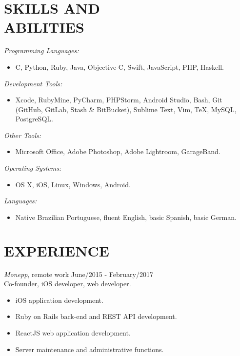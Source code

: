 \documentclass[margin]{res}
\begin{document}
\begin{resume}
		\section{SKILLS AND \\ABILITIES}
			{\sl Programming Languages:}
			\begin{itemize}
	 			\item[] C, Python, Ruby, Java, Objective-C, Swift, JavaScript, PHP, Haskell.
	  		\end{itemize}
			{\sl Development Tools:}
			\begin{itemize}
				\item [] Xcode, RubyMine, PyCharm, PHPStorm, Android Studio, Bash, Git (GitHub, GitLab, Stash \& BitBucket), Sublime Text, Vim, \TeX, MySQL, PostgreSQL.
			\end{itemize}
			{\sl Other Tools:}
			\begin{itemize}
	 			\item[] Microsoft Office, Adobe Photoshop, Adobe Lightroom, GarageBand. 	
			\end{itemize}
		    {\sl Operating Systems:}
	 		\begin{itemize}
	 			\item[] OS X, iOS, Linux, Windows, Android.
	   		\end{itemize}
			{\sl Languages:}
			\begin{itemize}
				\item[] Native Brazilian Portuguese, fluent English, basic Spanish, basic German.
			\end{itemize}

 		\section{EXPERIENCE}
 			{\sl Monepp}, remote work \hfill June/2015 - February/2017 \\
			Co-founder, iOS developer, web developer.
			\begin{itemize}
				\itemsep -2pt
		    	\item iOS application development.
		    	\item Ruby on Rails back-end and REST API development.
		    	\item ReactJS web application development.
		    	\item Server maintenance and administrative functions.
			\end{itemize}
 		

\end{resume}
\end{document}
